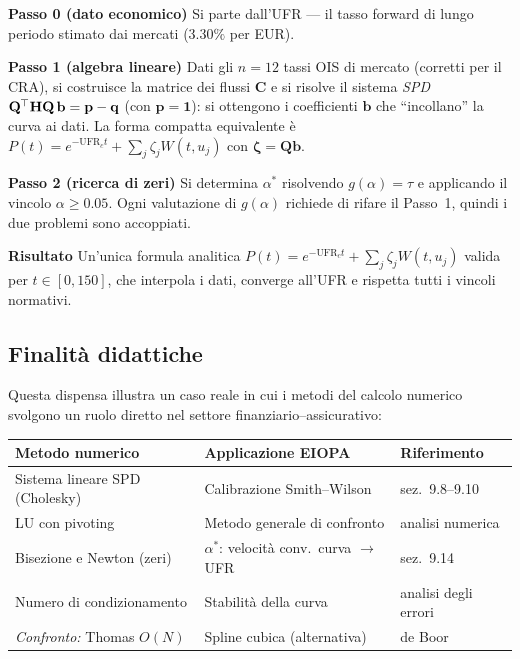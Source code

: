 \documentclass[11pt,a4paper]{article}
\theoremstyle{plain}
\theoremstyle{definition}
\theoremstyle{remark}
\newcommand{\UFR}{\mathrm{UFR}}
\newcommand{\bfzeta}{\bm{\zeta}}
\newcommand{\bfb}{\mathbf{b}}
\newcommand{\bfp}{\mathbf{p}}
\newcommand{\bfq}{\mathbf{q}}
\newcommand{\bfone}{\mathbf{1}}
\newcommand{\Hmat}{\mathbf{H}}
\newcommand{\Cmat}{\mathbf{C}}
\newcommand{\Qmat}{\mathbf{Q}}
\newcommand{\transp}{^{\mskip-1mu\top}}
\begin{document}
\begin{keybox}
\textbf{Passo 0 (dato economico)} Si parte dall'UFR --- il tasso forward di
lungo periodo stimato dai mercati ($3.30\%$ per EUR).

\textbf{Passo 1 (algebra lineare)} Dati gli $n=12$ tassi OIS di mercato
(corretti per il CRA), si costruisce la matrice dei flussi $\Cmat$ e si risolve il
sistema \emph{SPD} $\Qmat\transp\Hmat\Qmat\,\bfb = \bfp - \bfq$ (con $\bfp=\bfone$):
si ottengono i coefficienti $\bfb$ che ``incollano'' la curva ai dati. La forma
compatta equivalente è $P(t) = e^{-\UFR_c t} + \sum_j \zeta_j W(t,u_j)$ con
$\bfzeta = \Qmat\bfb$.

\textbf{Passo 2 (ricerca di zeri)} Si determina $\alpha^*$ risolvendo
$g(\alpha)=\tau$ e applicando il vincolo $\alpha\ge 0.05$. Ogni valutazione di
$g(\alpha)$ richiede di rifare il Passo~1, quindi i due problemi sono accoppiati.

\textbf{Risultato} Un'unica formula analitica $P(t) = e^{-\UFR_c t} +
\sum_j \zeta_j W(t,u_j)$ valida per $t \in [0,150]$, che interpola i dati,
converge all'UFR e rispetta tutti i vincoli normativi.
\end{keybox}

\subsection{Finalit\`a didattiche}

Questa dispensa illustra un caso reale in cui i metodi del calcolo numerico
svolgono un ruolo diretto nel settore finanziario--assicurativo:

\begin{center}
\renewcommand{\arraystretch}{1.3}
\begin{tabular}{lll}
\toprule
\textbf{Metodo numerico} & \textbf{Applicazione EIOPA} & \textbf{Riferimento}\\
\midrule
Sistema lineare SPD (Cholesky) & Calibrazione Smith--Wilson & sez.~9.8--9.10\\
LU con pivoting & Metodo generale di confronto & analisi numerica\\
Bisezione e Newton (zeri) & $\alpha^*$: velocità conv.\ curva $\to$ UFR & sez.~9.14\\
Numero di condizionamento & Stabilit\`a della curva & analisi degli errori\\
\emph{Confronto:} Thomas $O(N)$ & Spline cubica (alternativa) & de Boor~\cite{deBoor1978}\\
\bottomrule
\end{tabular}
\end{center}
\end{document}
